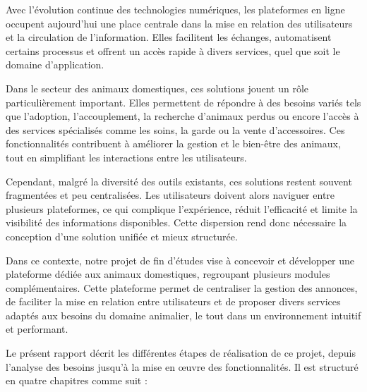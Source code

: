 Avec l’évolution continue des technologies numériques, les plateformes en ligne occupent aujourd’hui une place centrale dans la mise en relation des utilisateurs et la circulation de l’information. Elles facilitent les échanges, automatisent certains processus et offrent un accès rapide à divers services, quel que soit le domaine d’application.

Dans le secteur des animaux domestiques, ces solutions jouent un rôle particulièrement important. Elles permettent de répondre à des besoins variés tels que l’adoption, l’accouplement, la recherche d’animaux perdus ou encore l’accès à des services spécialisés comme les soins, la garde ou la vente d’accessoires. Ces fonctionnalités contribuent à améliorer la gestion et le bien-être des animaux, tout en simplifiant les interactions entre les utilisateurs.

Cependant, malgré la diversité des outils existants, ces solutions restent souvent fragmentées et peu centralisées. Les utilisateurs doivent alors naviguer entre plusieurs plateformes, ce qui complique l’expérience, réduit l’efficacité et limite la visibilité des informations disponibles. Cette dispersion rend donc nécessaire la conception d’une solution unifiée et mieux structurée.

Dans ce contexte, notre projet de fin d’études vise à concevoir et développer une plateforme dédiée aux animaux domestiques, regroupant plusieurs modules complémentaires. Cette plateforme permet de centraliser la gestion des annonces, de faciliter la mise en relation entre utilisateurs et de proposer divers services adaptés aux besoins du domaine animalier, le tout dans un environnement intuitif et performant.

Le présent rapport décrit les différentes étapes de réalisation de ce projet, depuis l’analyse des besoins jusqu’à la mise en œuvre des fonctionnalités. Il est structuré en quatre chapitres comme suit :

